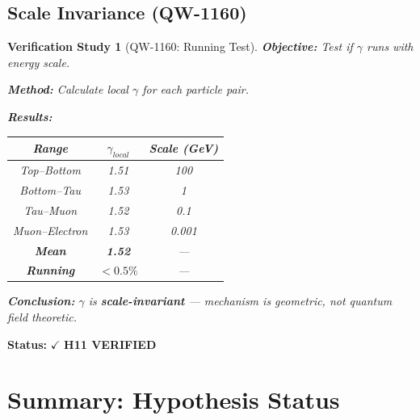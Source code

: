 \documentclass[11pt, a4paper]{article}
\newtheorem{verification}{Verification Study}[section]
\theoremstyle{remark}
\begin{document}
\subsection{Scale Invariance (QW-1160)}

\begin{verification}[QW-1160: Running Test]
\textbf{Objective:} Test if $\gamma$ runs with energy scale.

\textbf{Method:} Calculate local $\gamma$ for each particle pair.

\textbf{Results:}
\begin{center}
\begin{tabular}{|c|c|c|}
\hline
\textbf{Range} & $\gamma_{local}$ & \textbf{Scale (GeV)} \\
\hline
Top--Bottom & 1.51 & 100 \\
Bottom--Tau & 1.53 & 1 \\
Tau--Muon & 1.52 & 0.1 \\
Muon--Electron & 1.53 & 0.001 \\
\hline
\textbf{Mean} & \textbf{1.52} & --- \\
\textbf{Running} & $<0.5\%$ & --- \\
\hline
\end{tabular}
\end{center}

\textbf{Conclusion:} $\gamma$ is \textbf{scale-invariant} --- mechanism is geometric, not quantum field theoretic.
\end{verification}

\textbf{Status:} $\checkmark$ \textbf{H11 VERIFIED}

\section{Summary: Hypothesis Status}
\end{document}
